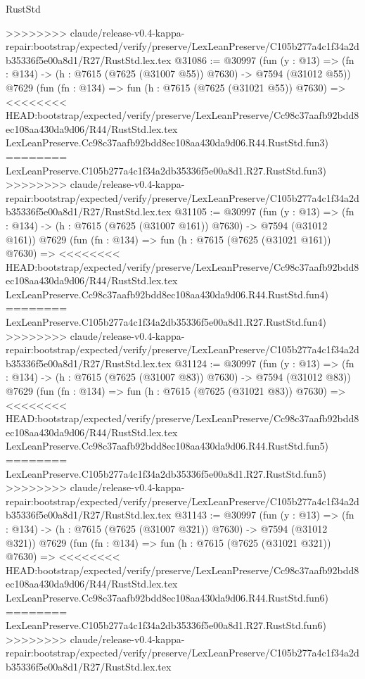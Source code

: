 \begin{lexlean}{RustStd}
\begin{coremodule}
{\begin{coremodule}
{{{{{{{{{{{{{{{{{{{{{{{{{{{{{{{{{{>>>>>>>> claude/release-v0.4-kappa-repair:bootstrap/expected/verify/preserve/LexLeanPreserve/C105b277a4c1f34a2db35336f5e00a8d1/R27/RustStd.lex.tex
@31086 := @30997
    (fun (y : @13) => (fn : @134) -> (h : @7615 (@7625 (@31007 @55)) @7630) -> @7594 (@31012 @55))
    @7629
    (fun (fn : @134) =>
    fun (h : @7615 (@7625 (@31021 @55)) @7630) =>
<<<<<<<< HEAD:bootstrap/expected/verify/preserve/LexLeanPreserve/Cc98c37aafb92bdd8ec108aa430da9d06/R44/RustStd.lex.tex
    LexLeanPreserve.Cc98c37aafb92bdd8ec108aa430da9d06.R44.RustStd.fun3)
========
    LexLeanPreserve.C105b277a4c1f34a2db35336f5e00a8d1.R27.RustStd.fun3)
>>>>>>>> claude/release-v0.4-kappa-repair:bootstrap/expected/verify/preserve/LexLeanPreserve/C105b277a4c1f34a2db35336f5e00a8d1/R27/RustStd.lex.tex
@31105 := @30997
    (fun (y : @13) => (fn : @134) -> (h : @7615 (@7625 (@31007 @161)) @7630) -> @7594 (@31012 @161))
    @7629
    (fun (fn : @134) =>
    fun (h : @7615 (@7625 (@31021 @161)) @7630) =>
<<<<<<<< HEAD:bootstrap/expected/verify/preserve/LexLeanPreserve/Cc98c37aafb92bdd8ec108aa430da9d06/R44/RustStd.lex.tex
    LexLeanPreserve.Cc98c37aafb92bdd8ec108aa430da9d06.R44.RustStd.fun4)
========
    LexLeanPreserve.C105b277a4c1f34a2db35336f5e00a8d1.R27.RustStd.fun4)
>>>>>>>> claude/release-v0.4-kappa-repair:bootstrap/expected/verify/preserve/LexLeanPreserve/C105b277a4c1f34a2db35336f5e00a8d1/R27/RustStd.lex.tex
@31124 := @30997
    (fun (y : @13) => (fn : @134) -> (h : @7615 (@7625 (@31007 @83)) @7630) -> @7594 (@31012 @83))
    @7629
    (fun (fn : @134) =>
    fun (h : @7615 (@7625 (@31021 @83)) @7630) =>
<<<<<<<< HEAD:bootstrap/expected/verify/preserve/LexLeanPreserve/Cc98c37aafb92bdd8ec108aa430da9d06/R44/RustStd.lex.tex
    LexLeanPreserve.Cc98c37aafb92bdd8ec108aa430da9d06.R44.RustStd.fun5)
========
    LexLeanPreserve.C105b277a4c1f34a2db35336f5e00a8d1.R27.RustStd.fun5)
>>>>>>>> claude/release-v0.4-kappa-repair:bootstrap/expected/verify/preserve/LexLeanPreserve/C105b277a4c1f34a2db35336f5e00a8d1/R27/RustStd.lex.tex
@31143 := @30997
    (fun (y : @13) => (fn : @134) -> (h : @7615 (@7625 (@31007 @321)) @7630) -> @7594 (@31012 @321))
    @7629
    (fun (fn : @134) =>
    fun (h : @7615 (@7625 (@31021 @321)) @7630) =>
<<<<<<<< HEAD:bootstrap/expected/verify/preserve/LexLeanPreserve/Cc98c37aafb92bdd8ec108aa430da9d06/R44/RustStd.lex.tex
    LexLeanPreserve.Cc98c37aafb92bdd8ec108aa430da9d06.R44.RustStd.fun6)
========
    LexLeanPreserve.C105b277a4c1f34a2db35336f5e00a8d1.R27.RustStd.fun6)
>>>>>>>> claude/release-v0.4-kappa-repair:bootstrap/expected/verify/preserve/LexLeanPreserve/C105b277a4c1f34a2db35336f5e00a8d1/R27/RustStd.lex.tex
}}}}}}}}}}}}}}}}}}}}}}}}}}}}}}}}}}
\end{coremodule}}
\end{coremodule}
\end{lexlean}

